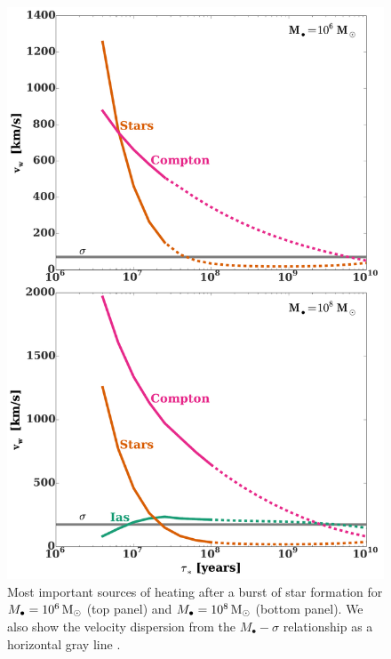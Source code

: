 \documentclass[usenatbib,fleqn]{mn2e}
\newcommand{\Mbh}[1][]{M_{\bullet#1}}
\begin{document}
\begin{figure}
\includegraphics[width=\columnwidth]{vwSourcesImp.pdf}
\caption{\label{fig:vwSourcesImp} Most important sources of heating
  after a burst of star formation for $\Mbh=10^6 \Msun$ (top panel)
  and $\Mbh= 10^8 \Msun$ (bottom panel). We also show the velocity
  dispersion from the $\Mbh-\sigma$ relationship as a horizontal gray line
  \citep{Gultekin+09}.}
\end{figure}
\end{document}
